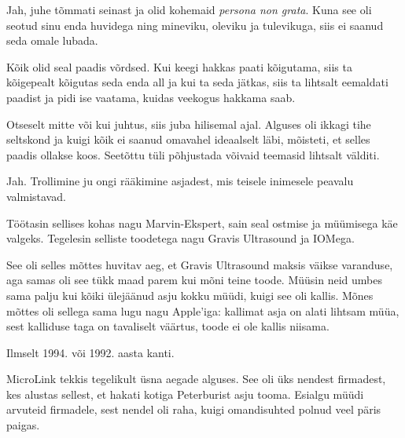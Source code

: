 
Jah, juhe tõmmati seinast ja olid kohemaid \emph{persona 
non grata}. Kuna see oli seotud sinu enda huvidega ning
mineviku, oleviku ja tulevikuga, siis ei saanud seda omale lubada.


Kõik olid seal paadis võrdsed. Kui keegi hakkas paati 
kõigutama, siis ta kõigepealt kõigutas seda enda all ja kui ta seda jätkas, siis ta lihtsalt eemaldati paadist ja pidi ise vaatama, kuidas 
veekogus hakkama saab.


Otseselt mitte või kui juhtus, siis juba hilisemal ajal. 
Alguses oli ikkagi tihe seltskond ja kuigi kõik ei saanud omavahel 
ideaalselt läbi, mõisteti, et selles paadis ollakse koos. Seetõttu tüli põhjustada võivaid teemasid
lihtsalt välditi.


Jah. Trollimine ju ongi rääkimine asjadest, mis teisele 
inimesele peavalu valmistavad.


Töötasin sellises kohas nagu Marvin-Ekspert, sain seal ostmise ja müümisega käe valgeks. Tegelesin selliste toodetega nagu Gravis Ultrasound ja 
IOMega.

See oli selles mõttes huvitav aeg, et Gravis Ultrasound maksis väikse 
varanduse, aga samas oli see tükk maad parem kui mõni teine toode. Müüsin neid umbes sama palju kui kõiki 
ülejäänud asju kokku müüdi, kuigi see oli kallis. Mõnes mõttes oli sellega sama lugu nagu 
Apple'iga: kallimat asja on alati lihtsam müüa, sest kalliduse taga on tavaliselt 
väärtus, toode ei ole kallis niisama.


Ilmselt 1994. või 1992. aasta kanti.


MicroLink tekkis tegelikult üsna aegade alguses. See oli üks nendest firmadest, kes 
alustas sellest, et hakati kotiga Peterburist asju tooma. Esialgu müüdi 
arvuteid firmadele, sest nendel oli raha, kuigi 
omandisuhted polnud veel päris paigas.

